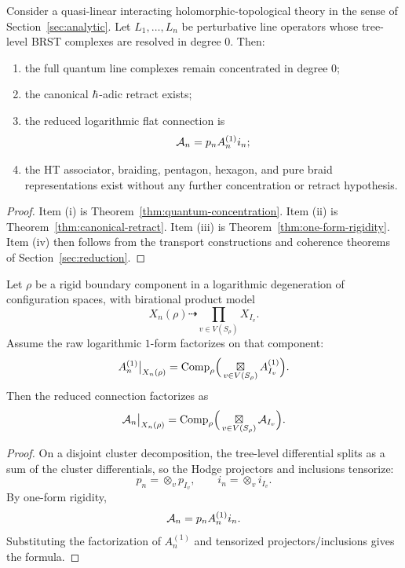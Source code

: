 \begin{theorem}%
Consider a quasi-linear interacting holomorphic-topological theory in the sense of Section~\ref{sec:analytic}. Let $L_1,\dots,L_n$ be perturbative line operators whose tree-level BRST complexes are resolved in degree $0$. Then:
\begin{enumerate}[label=\textup{(\roman*)}]
 \item the full quantum line complexes remain concentrated in degree $0$;
 \item the canonical $\hbar$-adic retract exists;
 \item the reduced logarithmic flat connection is
 \[
 \mathcal A_n = p_nA_n^{(1)}i_n;
 \]
 \item the HT associator, braiding, pentagon, hexagon, and pure braid representations exist without any further concentration or retract hypothesis.
\end{enumerate}
\end{theorem}

\begin{proof}
Item (i) is Theorem~\ref{thm:quantum-concentration}. Item (ii) is Theorem~\ref{thm:canonical-retract}. Item (iii) is Theorem~\ref{thm:one-form-rigidity}. Item (iv) then follows from the transport constructions and coherence theorems of Section~\ref{sec:reduction}.
\end{proof}

\begin{theorem}%
Let $\rho$ be a rigid boundary component in a logarithmic degeneration of configuration spaces, with birational product model
\[
 X_n(\rho) \dashrightarrow \prod_{v\in V(S_\rho)} X_{I_v}.
\]
Assume the raw logarithmic $1$-form factorizes on that component:
\[
 A_n^{(1)}\big|_{X_n(\rho)}
 =
 \mathrm{Comp}_\rho\Big(\mathop{\boxtimes}\displaylimits_{v\in V(S_\rho)} A_{I_v}^{(1)}\Big).
\]
Then the reduced connection factorizes as
\[
 \mathcal A_n\big|_{X_n(\rho)}
 =
 \mathrm{Comp}_\rho\Big(\mathop{\boxtimes}\displaylimits_{v\in V(S_\rho)} \mathcal A_{I_v}\Big).
\]
\end{theorem}

\begin{proof}
On a disjoint cluster decomposition, the tree-level differential splits as a sum of the cluster differentials, so the Hodge projectors and inclusions tensorize:
\[
 p_n=\otimes_v p_{I_v},
 \qquad
 i_n=\otimes_v i_{I_v}.
\]
By one-form rigidity,
\[
 \mathcal A_n=p_nA_n^{(1)}i_n.
\]
Substituting the factorization of $A_n^{(1)}$ and tensorized projectors/inclusions gives the formula.
\end{proof}

